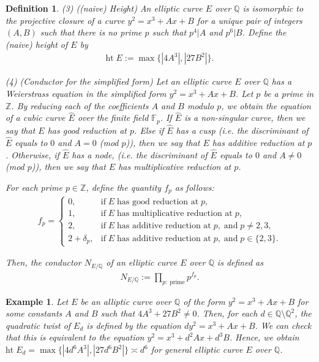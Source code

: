 \documentclass[12pt,reqno]{amsart}
\newtheorem{definition}[thm]{Definition}
\newtheorem{example}[thm]{Example}
\numberwithin{equation}{section}
\def\Z{{\mathbb Z}}
\def\Q{{\mathbb Q}}
\begin{document}
\begin{definition}
{\smallskip

(3) ((naive) Height) An elliptic curve $E$ over $\Q$ is isomorphic to the projective closure of a curve $y^2 = x^3 + Ax + B$ for a unique pair of integers $(A,B)$ such that there is no prime $p$ such that $p^4 | A$ and $p^6 | B$. Define the (naive) height of $E$ by
\begin{align*}
\text{ht} \; E:= \max \{|4A^3|, |27B^2|\}.
\end{align*}


\smallskip

(4) (Conductor for the simplified form) Let an elliptic curve $E$ over $\Q$ has a Weierstrass equation in the simplified form $y^2 = x^3 + Ax + B$. Let $p$ be a prime in $\Z$. By reducing each of the coefficients $A$ and $B$ modulo $p$, we obtain the equation of a cubic curve $\widehat{E}$ over the finite field $\mathbb{F}_p$. If $\widehat{E}$ is a non-singular curve, then we say that $E$ has good reduction at $p$. Else if $\widehat{E}$ has a cusp (i.e. the discriminant of $\widehat{E}$ equals to $0$ and $A = 0$ (mod $p$)), then we say that $E$ has additive reduction at $p$. Otherwise, if $\widehat{E}$ has a node,  (i.e. the discriminant of $\widehat{E}$ equals to $0$ and $A \neq 0$ (mod $p$)), then we say that $E$ has multiplicative reduction at $p$.

For each prime $p \in \Z$, define the quantity $f_p$ as follows:
\begin{align*}
f_p = \begin{cases}
0, & \mbox{if} \; E \; \text{has good reduction at} \; p, \\
1, & \mbox{if} \; E \; \text{has multiplicative reduction at} \; p, \\
2, & \mbox{if} \; E \; \text{has additive reduction at} \; p, \; \text{and} \; p \neq 2,3, \\
2+ \delta_p, & \mbox{if} \; E \; \text{has additive reduction at} \; p, \; \text{and} \; p \in \{2,3\}.
\end{cases}
\end{align*}

Then, the conductor $N_{E/\Q}$ of an elliptic curve $E$ over $\Q$ is defined as
\begin{align*}
N_{E/\Q} := \prod_{p: \; \text{prime}} p^{f_p}.
\end{align*}

}
\end{definition}

\begin{example}\label{htEd}
{\rm
 Let $E$ be an alliptic curve over $\Q$ of the form $y^2 = x^3 + Ax +B$ for some constants $A$ and $B$ such that $4A^3 + 27B^2 \neq 0$. Then, for each $d \in \Q \setminus \Q^2$, the quadratic twist of $E_d$ is defined by the equation $dy^2 = x^3 + Ax + B$. We can check that this is equivalent to the equation $y^2 = x^3 + d^2Ax + d^3B$. Hence, we obtain $\text{ht} \; E_d = \max \{ |4d^6A^3|, |27d^6B^2|\} \asymp d^6$ for general elliptic curve $E$ over $\Q$.
}
\end{example}
\vspace{2mm}
\end{document}

